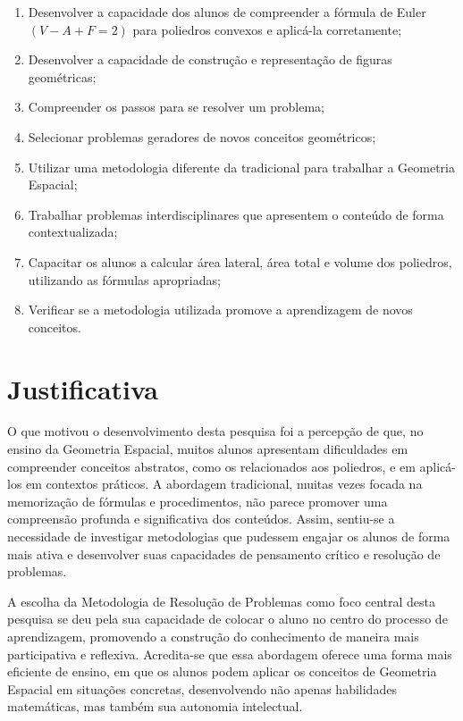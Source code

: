 \begin{enumerate}
    \item Desenvolver a capacidade dos alunos de compreender a fórmula de Euler $(V - A + F = 2)$  para poliedros convexos e aplicá-la corretamente;
    \item Desenvolver a capacidade de construção e representação de figuras geométricas;
    \item Compreender os passos para se resolver um problema;
    \item Selecionar problemas geradores de novos conceitos geométricos;
    \item Utilizar uma metodologia diferente da tradicional para trabalhar a Geometria Espacial;
    \item Trabalhar problemas interdisciplinares que apresentem o conteúdo de forma contextualizada;
    \item Capacitar os alunos a calcular área lateral, área total e volume dos poliedros, utilizando as fórmulas apropriadas;
    \item Verificar se a metodologia utilizada promove a aprendizagem de novos conceitos.
\end{enumerate}

\section{Justificativa}

O que motivou o desenvolvimento desta pesquisa foi a percepção de que, no ensino da Geometria Espacial, muitos alunos apresentam dificuldades em compreender conceitos abstratos, como os relacionados aos poliedros, e em aplicá-los em contextos práticos. A abordagem tradicional, muitas vezes focada na memorização de fórmulas e procedimentos, não parece promover uma compreensão profunda e significativa dos conteúdos. Assim, sentiu-se a necessidade de investigar metodologias que pudessem engajar os alunos de forma mais ativa e desenvolver suas capacidades de pensamento crítico e resolução de problemas.

A escolha da Metodologia de Resolução de Problemas como foco central desta pesquisa se deu pela sua capacidade de colocar o aluno no centro do processo de aprendizagem, promovendo a construção do conhecimento de maneira mais participativa e reflexiva. Acredita-se que essa abordagem oferece uma forma mais eficiente de ensino, em que os alunos podem aplicar os conceitos de Geometria Espacial em situações concretas, desenvolvendo não apenas habilidades matemáticas, mas também sua autonomia intelectual.

